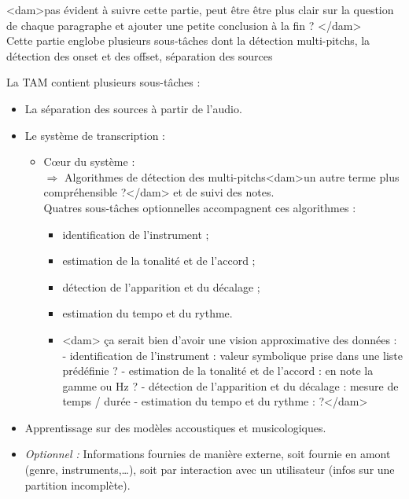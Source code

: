 <dam>pas évident à suivre cette partie, peut être être plus clair sur la
question de chaque paragraphe et ajouter une petite conclusion à la fin ?
</dam>\\

Cette partie englobe plusieurs sous-tâches dont la détection multi-pitchs, 
la détection des onset et des offset, séparation des sources


La TAM contient plusieurs sous-tâches :
\begin{itemize}
	\item La séparation des sources à partir de l’audio.
	\item Le système de transcription :
	\begin{itemize}
		\item Cœur du système :\\
		$\Rightarrow$ Algorithmes de détection des multi-pitchs<dam>un autre
        terme plus compréhensible ?</dam> et de suivi des \tab notes.\\
		Quatres sous-tâches optionnelles accompagnent ces algorithmes :
		\begin{itemize}
			\item identification de l’instrument ;
			\item estimation de la tonalité et de l’accord ;
			\item détection de l’apparition et du décalage ;
			\item estimation du tempo et du rythme.
            \item <dam> ça serait bien d'avoir une vision approximative des
                données :
- identification de l’instrument : valeur symbolique prise dans une liste
  prédéfinie ?
- estimation de la tonalité et de l’accord : en note la gamme ou Hz ?
- détection de l’apparition et du décalage : mesure de temps / durée
- estimation du tempo et du rythme : ?</dam>
		\end{itemize}
	\end{itemize}
	\item Apprentissage sur des modèles accoustiques et musicologiques.
	\item \textit{Optionnel :} Informations fournies de manière externe, soit
        fournie en amont (genre, instruments,…), soit par interaction avec un
        utilisateur (infos sur une partition incomplète).
\end{itemize}
